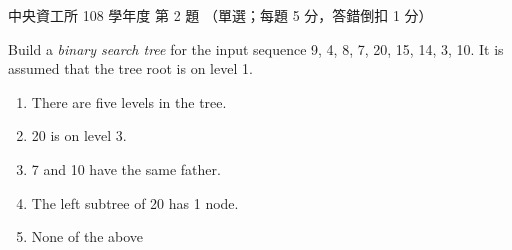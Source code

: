 \begin{pastexam}[label={px:ncu-108-dsa-02}]{中央資工所 108 學年度 第 2 題}
（單選；每題 5 分，答錯倒扣 1 分）

Build a \textit{binary search tree} for the input sequence 9, 4, 8, 7, 20, 15, 14, 3, 10. It is
assumed that the tree root is on level 1.
\begin{enumerate}[label=(\Alph*)]
\item There are five levels in the tree.
\item 20 is on level 3.
\item 7 and 10 have the same father.
\item The left subtree of 20 has 1 node.
\item None of the above
\end{enumerate}
\end{pastexam}


